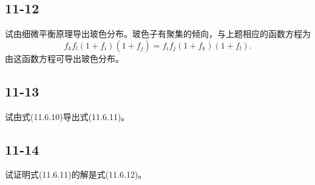 \newpage
\subsection{11-12}
试由细微平衡原理导出玻色分布。玻色子有聚集的倾向，与上题相应的函数方程为
$$ f_k f_l (1 + f_i) (1 + f_j) = f_i f_j (1 + f_k) (1 + f_l). $$
由这函数方程可导出玻色分布。

\newpage
\subsection{11-13}
试由式(11.6.10)导出式(11.6.11)。

\newpage
\subsection{11-14}
试证明式(11.6.11)的解是式(11.6.12)。

